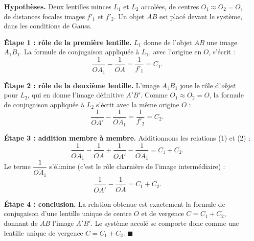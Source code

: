 \documentclass[11pt]{article}
\begin{document}
\begin{experience}
\textbf{Hypothèses.} Deux lentilles minces $L_1$ et $L_2$ accolées, de centres $O_1 \approx O_2 = O$, de distances focales images $f'_1$ et $f'_2$. Un objet $AB$ est placé devant le système, dans les conditions de Gauss.

\textbf{Étape 1 : rôle de la première lentille.} $L_1$ donne de l'objet $AB$ une image $A_1B_1$. La formule de conjugaison appliquée à $L_1$, avec l'origine en $O$, s'écrit :
\[ \frac{1}{\overline{OA_1}} - \frac{1}{\overline{OA}} = \frac{1}{f'_1} = C_1. \tag{1} \]

\textbf{Étape 2 : rôle de la deuxième lentille.} L'image $A_1B_1$ joue le rôle d'\emph{objet} pour $L_2$, qui en donne l'image définitive $A'B'$. Comme $O_1 \approx O_2 = O$, la formule de conjugaison appliquée à $L_2$ s'écrit avec la même origine $O$ :
\[ \frac{1}{\overline{OA'}} - \frac{1}{\overline{OA_1}} = \frac{1}{f'_2} = C_2. \tag{2} \]

\textbf{Étape 3 : addition membre à membre.} Additionnons les relations (1) et (2) :
\[ \frac{1}{\overline{OA_1}} - \frac{1}{\overline{OA}} + \frac{1}{\overline{OA'}} - \frac{1}{\overline{OA_1}} = C_1 + C_2. \]
Le terme $\dfrac{1}{\overline{OA_1}}$ s'élimine (c'est le rôle charnière de l'image intermédiaire) :
\[ \frac{1}{\overline{OA'}} - \frac{1}{\overline{OA}} = C_1 + C_2. \]

\textbf{Étape 4 : conclusion.} La relation obtenue est exactement la formule de conjugaison d'une lentille unique de centre $O$ et de vergence $C = C_1 + C_2$, donnant de $AB$ l'image $A'B'$. Le système accolé se comporte donc comme une lentille unique de vergence $C = C_1 + C_2$. \hfill $\blacksquare$
\end{experience}
\end{document}
